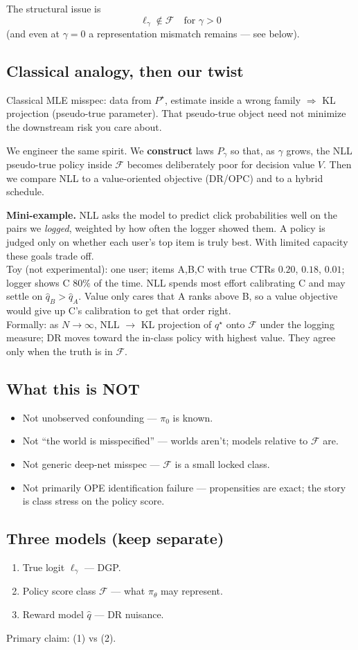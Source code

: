 \documentclass[11pt]{article}
\newcommand{\phonesub}[1]{\Needspace{6\baselineskip}\subsection*{#1}}
\newcommand{\miniex}[1]{\par{\footnotesize\color{black!70}\textbf{Mini-example.} #1\par}}
\begin{document}
The structural issue is
\[
\ell_{\gamma}\notin\mathcal{F}
\quad\text{for }\gamma>0
\]
(and even at $\gamma{=}0$ a representation
mismatch remains --- see below).

\phonesub{Classical analogy, then our twist}
Classical MLE misspec: data from $P^{\star}$,
estimate inside a wrong family $\Rightarrow$
KL projection (pseudo-true parameter).  That
pseudo-true object need not minimize the
downstream risk you care about.

We engineer the same spirit.  We
\textbf{construct} laws $P_{\gamma}$ so that,
as $\gamma$ grows, the NLL pseudo-true policy
inside $\mathcal{F}$ becomes deliberately
poor for decision value $V$.  Then we compare
NLL to a value-oriented objective (DR/OPC)
and to a hybrid schedule.

\miniex{NLL asks the model to predict click
probabilities well on the pairs we
\emph{logged}, weighted by how often the
logger showed them.  A policy is judged only
on whether each user's top item is truly
best.  With limited capacity these goals
trade off.\\[0.3em]
Toy (not experimental): one user; items
A,B,C with true CTRs $0.20$, $0.18$, $0.01$;
logger shows C $80\%$ of the time.  NLL
spends most effort calibrating C and may
settle on $\hat q_B>\hat q_A$.  Value only
cares that A ranks above B, so a value
objective would give up C's calibration to
get that order right.\\[0.3em]
Formally: as $N\to\infty$, NLL $\to$ KL
projection of $q^{\star}$ onto $\mathcal{F}$
under the logging measure; DR moves toward
the in-class policy with highest value.
They agree only when the truth is in
$\mathcal{F}$.}

\phonesub{What this is NOT}
\begin{itemize}
  \item Not unobserved confounding ---
        $\pi_{0}$ is known.
  \item Not ``the world is misspecified'' ---
        worlds aren't; models relative to
        $\mathcal{F}$ are.
  \item Not generic deep-net misspec ---
        $\mathcal{F}$ is a small locked class.
  \item Not primarily OPE identification
        failure --- propensities are exact;
        the story is class stress on the
        policy score.
\end{itemize}

\phonesub{Three models (keep separate)}
\begin{enumerate}
  \item True logit $\ell_{\gamma}$ --- DGP.
  \item Policy score class $\mathcal{F}$ ---
        what $\pi_{\theta}$ may represent.
  \item Reward model $\hat{q}$ --- DR
        nuisance.
\end{enumerate}
Primary claim: (1) vs (2).
\end{document}
